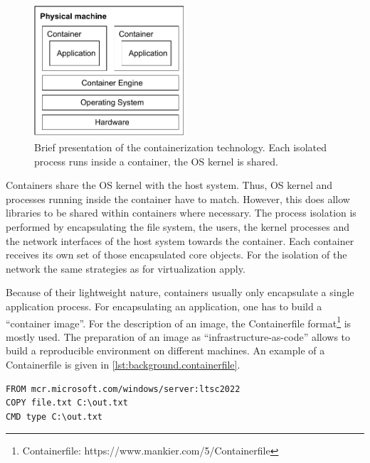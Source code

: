 \begin{figure}[b]
	\centering
	\includegraphics[width=0.5\textwidth]{Figures/containerization.pdf}
	\caption{Brief presentation of the containerization technology\cite{RamosApolinario.2021, Warrier.20201120}. Each isolated process runs inside a container, the \ac{OS} kernel is shared.}
	\label{fig:background.container}
\end{figure}

Containers share the \ac{OS} kernel with the host system.  Thus, \ac{OS} kernel and processes running inside the container have to match.
However, this does allow libraries to be shared within containers where necessary\cite{Warrier.20201120}.
The process isolation is performed by encapsulating the file system, the users, the kernel processes and the network interfaces of the host system towards the container. Each container receives its own set of those encapsulated core objects. For the isolation of the network the same strategies as for virtualization apply.

Because of their lightweight nature, containers usually only encapsulate a single application process. For encapsulating an application, one has to build a \enquote{container image}.  For the description of an image, the Containerfile format\footnote{Containerfile: https://www.mankier.com/5/Containerfile} is mostly used. The preparation of an image as \enquote{infrastructure-as-code} allows to build a reproducible environment on different machines. An example of a Containerfile is given in \autoref{lst:background.containerfile}.

\begin{lstlisting}[label=lst:background.containerfile, caption={Example of a container file. A file (file.txt) is copied to a Windows Server container (to C:\textbackslash out.txt), and this file is printed during the container run using the command.}, language=docker]
FROM mcr.microsoft.com/windows/server:ltsc2022
COPY file.txt C:\out.txt
CMD type C:\out.txt
\end{lstlisting}

